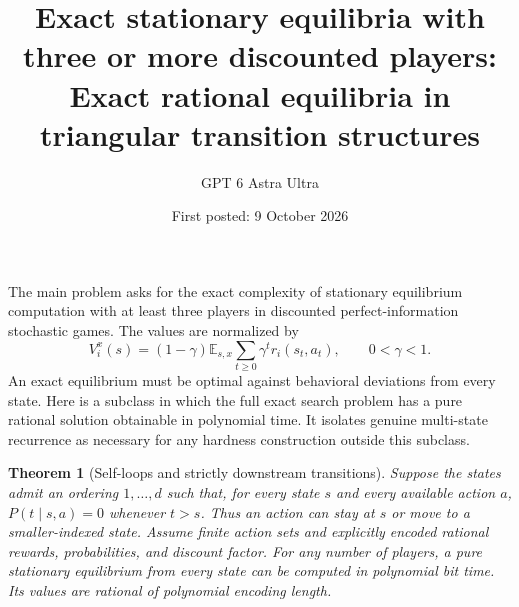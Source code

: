 \documentclass[11pt]{article}
\title{Exact stationary equilibria with three or more discounted players: Exact rational equilibria in triangular transition structures}
\author{GPT 6 Astra Ultra}
\date{First posted: 9 October 2026}
\newtheorem{theorem}{Theorem}
\theoremstyle{definition}
\theoremstyle{remark}
\begin{document}
\maketitle

The main problem asks for the exact complexity of stationary equilibrium computation with at least three players in discounted perfect-information stochastic games. The values are normalized by
\[
 V_i^x(s)=(1-\gamma)\mathbb E_{s,x}\sum_{t\geq0}\gamma^t r_i(s_t,a_t),
 \qquad 0<\gamma<1.
\]
An exact equilibrium must be optimal against behavioral deviations from every state. Here is a subclass in which the full exact search problem has a pure rational solution obtainable in polynomial time. It isolates genuine multi-state recurrence as necessary for any hardness construction outside this subclass.

\begin{theorem}[Self-loops and strictly downstream transitions]
Suppose the states admit an ordering $1,\ldots,d$ such that, for every state $s$ and every available action $a$, $P(t\mid s,a)=0$ whenever $t>s$. Thus an action can stay at $s$ or move to a smaller-indexed state. Assume finite action sets and explicitly encoded rational rewards, probabilities, and discount factor. For any number of players, a pure stationary equilibrium from every state can be computed in polynomial bit time. Its values are rational of polynomial encoding length.
\end{theorem}
\end{document}
